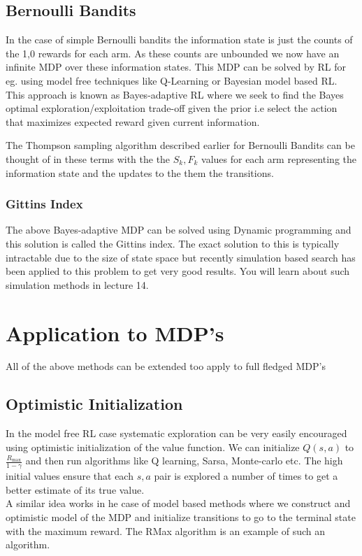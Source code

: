\documentclass{article}
\begin{document}
\subsection{Bernoulli Bandits}
In the case of simple Bernoulli bandits the information state is just the counts of the 1,0 rewards for each arm. As these counts are unbounded we now have an infinite MDP over these information states. This MDP can be solved by RL for eg. using model free techniques like Q-Learning or Bayesian model based RL.
This approach is known as Bayes-adaptive RL where we seek to find the Bayes optimal exploration/exploitation trade-off given the prior i.e select the action that maximizes expected reward given current information.

The Thompson sampling algorithm described earlier for Bernoulli Bandits can be thought of in these terms with the the $S_k,F_k$ values for each arm representing the information state and the updates to the them the transitions. 
\subsubsection{Gittins Index}
The above Bayes-adaptive MDP can be solved using Dynamic programming and this solution is called the Gittins index. The exact solution to this is typically intractable due to the size of state space but recently simulation based search has been applied to this problem to get very good results. You will learn about such simulation methods in lecture 14.

\section{Application to MDP's}
All of the above methods can be extended too apply to full fledged MDP's
\subsection{Optimistic Initialization}
In the model free RL case systematic exploration can be very easily encouraged using optimistic initialization of the value function. We can initialize $Q(s,a)$ to $\frac{R_{\max}}{1-\gamma}$ and then run algorithms like Q learning, Sarsa, Monte-carlo etc. The high initial values ensure that each $s,a$ pair is explored a number of times to get a better estimate of its true value. \\
A similar idea works in he case of model based methods where we construct and optimistic model of the MDP and initialize transitions to go to the terminal state with the maximum reward. The RMax algorithm \cite{rmax} is an example of such an algorithm.
\end{document}
